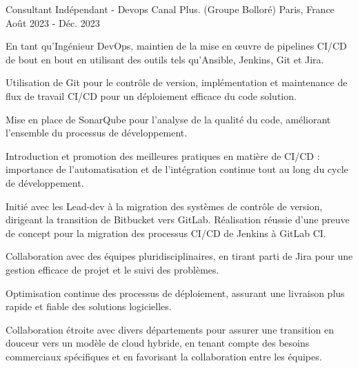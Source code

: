 \begin{cventries}
  \cventry
    {Consultant Indépendant - Devops} %
    {Canal Plus. (Groupe Bolloré)} %
    {Paris, France} %
    {Août 2023 - Déc. 2023} %
    {
      \begin{cvitems} %
        \item {En tant qu'Ingénieur DevOps, maintien de la mise en œuvre de pipelines CI/CD de bout en bout en utilisant des outils tels qu'Ansible, Jenkins, Git et Jira.}
        \item {Utilisation de Git pour le contrôle de version, implémentation et maintenance de flux de travail CI/CD pour un déploiement efficace du code solution.}
        \item {Mise en place de SonarQube pour l'analyse de la qualité du code, améliorant l'ensemble du processus de développement.}
        \item {Introduction et promotion des meilleures pratiques en matière de CI/CD : importance de l'automatisation et de l'intégration continue tout au long du cycle de développement.}
        \item {Initié avec les Lead-dev à la migration des systèmes de contrôle de version, dirigeant la transition de Bitbucket vers GitLab. Réalisation réussie d'une preuve de concept pour la migration des processus CI/CD de Jenkins à GitLab CI.}
        \item {Collaboration avec des équipes pluridisciplinaires, en tirant parti de Jira pour une gestion efficace de projet et le suivi des problèmes.}
        \item {Optimisation continue des processus de déploiement, assurant une livraison plus rapide et fiable des solutions logicielles.}
        \item {Collaboration étroite avec divers départements pour assurer une transition en douceur vers un modèle de cloud hybride, en tenant compte des besoins commerciaux spécifiques et en favorisant la collaboration entre les équipes.}
      \end{cvitems}
    }


\end{cventries}
